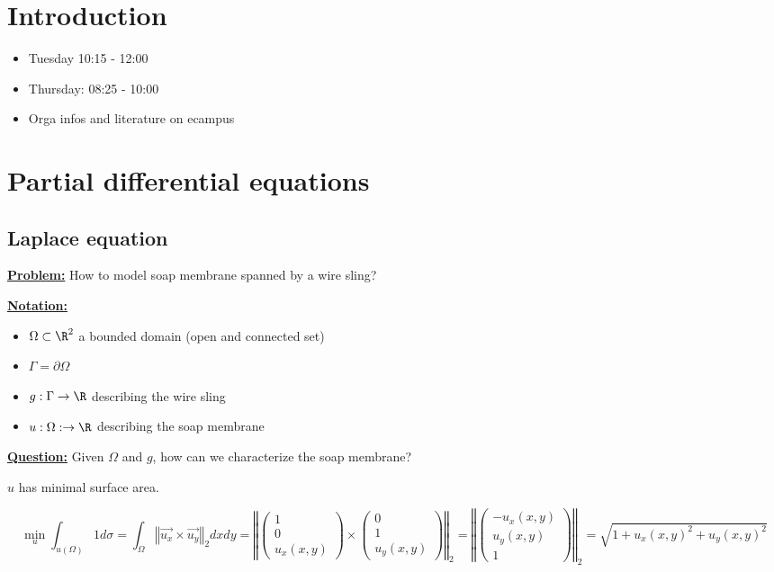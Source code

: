 \section*{Introduction}

\begin{itemize}
    \item Tuesday 10:15 - 12:00
    \item Thursday: 08:25 - 10:00
    \item Orga infos and literature on ecampus
\end{itemize}

\section{Partial differential equations}

\subsection{Laplace equation}

\underline{\textbf{Problem:}} How to model soap membrane spanned by a wire sling?

\underline{\textbf{Notation:}} 

\begin{itemize}
    \item $\Omega\subset \R^2$ a bounded domain (open and connected set)
    \item $\Gamma = \partial \Omega$
    \item $g: \Gamma\to \R$ describing the wire sling
    \item $u:\Omega:\to\R$ describing the soap membrane
\end{itemize}


\underline{\textbf{Question:}} Given $\Omega$ and $g$, how can we characterize the soap membrane?

$u$ has minimal surface area.

\[\min_u \int_{u(\Omega)} 1 d\sigma=\int_\Omega \left\Vert \overrightarrow{u_x}\times \overrightarrow{u_y} \right\Vert_2 dxdy=\left\Vert \begin{pmatrix}
    1\\0\\u_x(x,y)
\end{pmatrix} \times \begin{pmatrix}
    0\\1\\u_y(x,y)
\end{pmatrix}\right\Vert_2=\left\Vert \begin{pmatrix}
    -u_x(x,y)\\u_y(x,y)\\1
\end{pmatrix} \right\Vert_2=\sqrt{1+u_x(x,y)^2+u_y(x,y)^2}\]

